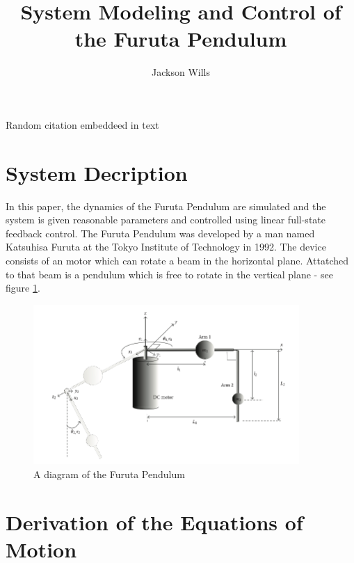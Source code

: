 \documentclass[letterpaper,10pt,oneside]{article}
\title{System Modeling and Control of the Furuta Pendulum}
\author{Jackson Wills}
\begin{document}
\maketitle

\tableofcontents

\newpage

Random citation \cite{SWINGUP} embeddeed in \citet{SWINGUP} text \cite{DYNAMICS}

\section{System Decription}

In this paper, the dynamics of the Furuta Pendulum are simulated and the system is given reasonable parameters and controlled using linear full-state feedback control. The Furuta Pendulum was developed by a man named Katsuhisa Furuta at the Tokyo Institute of Technology in 1992. The device consists of an motor which can rotate a beam in the horizontal plane. Attatched to that beam is a pendulum which is free to rotate in the vertical plane - see figure \ref{fig:diagram}.


\begin{figure}[h!]
  \centering
  \includegraphics[width=0.9\textwidth]{FurutaDiagram}
  \caption{A diagram of the Furuta Pendulum \citep{DYNAMICS}}
  \label{fig:diagram}
\end{figure}

\section{Derivation of the Equations of Motion}
\end{document}
